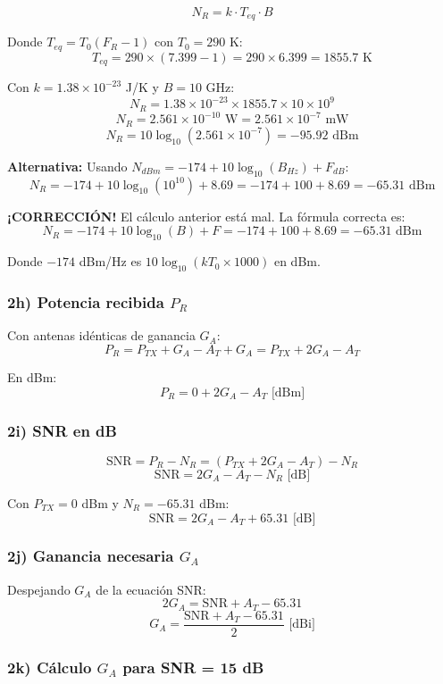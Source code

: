 \documentclass[a4paper,10pt]{article}
\begin{document}
$$N_R = k \cdot T_{eq} \cdot B$$

Donde $T_{eq} = T_0 (F_R - 1)$ con $T_0 = 290$ K:
$$T_{eq} = 290 \times (7.399 - 1) = 290 \times 6.399 = 1855.7 \text{ K}$$

Con $k = 1.38 \times 10^{-23}$ J/K y $B = 10$ GHz:
$$N_R = 1.38 \times 10^{-23} \times 1855.7 \times 10 \times 10^9$$
$$N_R = 2.561 \times 10^{-10} \text{ W} = 2.561 \times 10^{-7} \text{ mW}$$
$$\boxed{N_R = 10\log_{10}(2.561 \times 10^{-7}) = -95.92 \text{ dBm}}$$

\textbf{Alternativa:} Usando $N_{dBm} = -174 + 10\log_{10}(B_{Hz}) + F_{dB}$:
$$N_R = -174 + 10\log_{10}(10^{10}) + 8.69 = -174 + 100 + 8.69 = -65.31 \text{ dBm}$$

\textbf{¡CORRECCIÓN!} El cálculo anterior está mal. La fórmula correcta es:
$$N_R = -174 + 10\log_{10}(B) + F = -174 + 100 + 8.69 = \boxed{-65.31 \text{ dBm}}$$

Donde $-174$ dBm/Hz es $10\log_{10}(kT_0 \times 1000)$ en dBm.

\subsubsection{2h) Potencia recibida $P_R$}

Con antenas idénticas de ganancia $G_A$:
$$P_R = P_{TX} + G_A - A_T + G_A = P_{TX} + 2G_A - A_T$$

En dBm:
$$\boxed{P_R = 0 + 2G_A - A_T \text{ [dBm]}}$$

\subsubsection{2i) SNR en dB}

$$\text{SNR} = P_R - N_R = (P_{TX} + 2G_A - A_T) - N_R$$
$$\boxed{\text{SNR} = 2G_A - A_T - N_R \text{ [dB]}}$$

Con $P_{TX} = 0$ dBm y $N_R = -65.31$ dBm:
$$\boxed{\text{SNR} = 2G_A - A_T + 65.31 \text{ [dB]}}$$

\subsubsection{2j) Ganancia necesaria $G_A$}

Despejando $G_A$ de la ecuación SNR:
$$2G_A = \text{SNR} + A_T - 65.31$$
$$\boxed{G_A = \frac{\text{SNR} + A_T - 65.31}{2} \text{ [dBi]}}$$

\subsubsection{2k) Cálculo $G_A$ para SNR = 15 dB}
\end{document}
